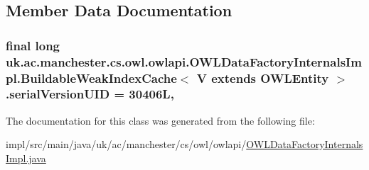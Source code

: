 \subsection{Member Data Documentation}
\hypertarget{classuk_1_1ac_1_1manchester_1_1cs_1_1owl_1_1owlapi_1_1_o_w_l_data_factory_internals_impl_1_1_bui2da4e2836e65187c58a7bd99e8ddeb30_a33c65f5c551e6c8a08407bb78404e62f}{
\subsubsection[{serial\-Version\-U\-I\-D}]{\setlength{\rightskip}{0pt plus 5cm}final long uk.\-ac.\-manchester.\-cs.\-owl.\-owlapi.\-O\-W\-L\-Data\-Factory\-Internals\-Impl.\-Buildable\-Weak\-Index\-Cache$<$ V extends {\bf O\-W\-L\-Entity} $>$.serial\-Version\-U\-I\-D = 30406\-L\hspace{0.3cm}{\ttfamily [static]}, {\ttfamily [private]}}}\label{classuk_1_1ac_1_1manchester_1_1cs_1_1owl_1_1owlapi_1_1_o_w_l_data_factory_internals_impl_1_1_bui2da4e2836e65187c58a7bd99e8ddeb30_a33c65f5c551e6c8a08407bb78404e62f}


The documentation for this class was generated from the following file\-:\begin{DoxyCompactItemize}
\item 
impl/src/main/java/uk/ac/manchester/cs/owl/owlapi/\hyperlink{_o_w_l_data_factory_internals_impl_8java}{O\-W\-L\-Data\-Factory\-Internals\-Impl.\-java}\end{DoxyCompactItemize}

